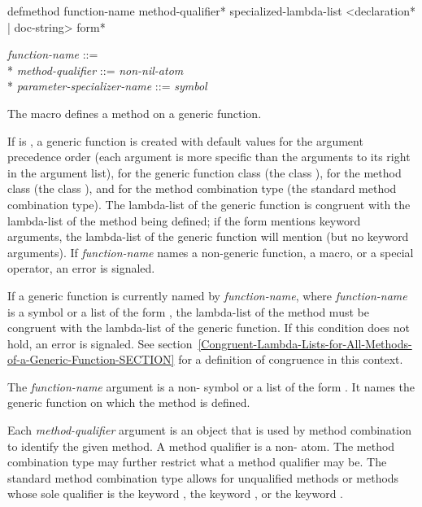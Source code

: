 \begin{defmac}
defmethod function-name {method-qualifier}*
          specialized-lambda-list
          <{declaration}* | doc-string> {form}*

\begin{tabbing}
\emph{function-name\/} ::=  \\*
\emph{method-qualifier\/} ::= \emph{non-nil-atom} \\*
\emph{parameter-specializer-name\/} ::= \emph{symbol} {\Mor} 
\end{tabbing}
The macro  defines a method on a generic function.  

If  is , a generic
function is created with default values for the argument precedence
order (each argument is more specific than the arguments to its right
in the argument list), for the generic function class (the class 
), for the method class (the class 
), and for the method combination type (the standard
method combination type).  The lambda-list of the generic function is
congruent with the lambda-list of the method being defined; if the
 form mentions keyword arguments, the lambda-list of
the generic function will mention  (but no keyword
arguments).  If \emph{function-name\/} names a non-generic
function, a macro, or a special operator, an error is signaled.

If a generic function is currently named by {\it
function-name\/}, where \emph{function-name\/} is a symbol or
a list of the form , the lambda-list of the
method must be congruent with the lambda-list of the generic function.
If this condition does not hold, an error is signaled.  See
section~\ref{Congruent-Lambda-Lists-for-All-Methods-of-a-Generic-Function-SECTION}
for a definition of congruence in this context.




The \emph{function-name\/} argument is a non- symbol or a
list of the form .  It names the generic
function on which the method is defined.

Each \emph{method-qualifier\/} argument is an object that is used by
method combination to identify the given method.  A method qualifier
is a non- atom.  The method combination type may further
restrict what a method qualifier may be.  The standard method
combination type allows for unqualified methods or methods whose sole
qualifier is the keyword , the keyword 
, or the keyword .


\end{defmac}
